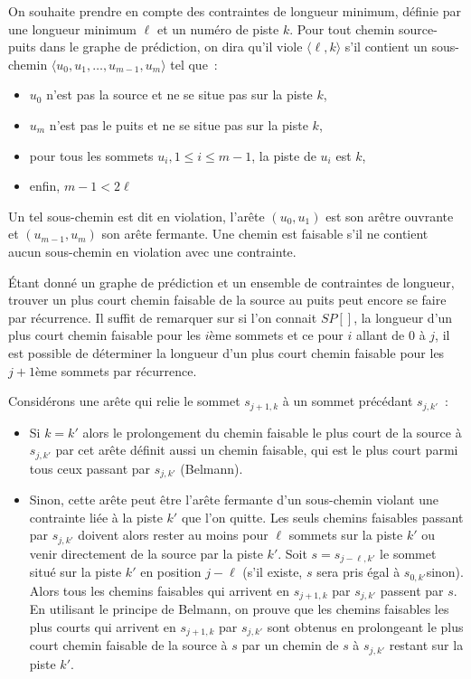 \documentclass[a4paper]{article}
\begin{document}
On souhaite prendre en compte des contraintes de longueur minimum,
d\'efinie par une longueur minimum $\ell$ et un num\'ero de piste $k$. Pour
tout chemin source-puits dans le graphe de pr\'ediction, on dira qu'il
viole $\langle\ell,k\rangle$ s'il contient un sous-chemin $\langle
u_0,u_1,\ldots,u_{m-1},u_m\rangle$ tel que~:
\begin{itemize}
\item $u_0$ n'est pas la source et ne se situe pas sur la piste $k$,
\item $u_m$ n'est pas le puits et ne se situe pas sur la piste $k$,
\item pour tous les sommets $u_i, 1\leq i\leq m-1$, la piste de $u_i$
  est $k$,
\item enfin, $m-1 < 2\ell$
\end{itemize}

Un tel sous-chemin est dit en violation, l'ar\^ete $(u_0,u_1)$ est son
ar\^etre ouvrante et $(u_{m-1},u_m)$ son ar\^ete fermante. Une chemin est
faisable s'il ne contient aucun sous-chemin en violation avec une
contrainte.

\'Etant donn\'e un graphe de pr\'ediction et un ensemble de contraintes de
longueur, trouver un plus court chemin faisable de la source au puits
peut encore se faire par r\'ecurrence. Il suffit de remarquer sur si
l'on connait $SP[]$, la longueur d'un plus court chemin faisable pour
les $i$\`eme sommets et ce pour $i$ allant de $0$ \`a $j$, il est possible
de d\'eterminer la longueur d'un plus court chemin faisable pour les
$j+1$\`eme sommets par r\'ecurrence.

Consid\'erons une ar\^ete qui relie le sommet $s_{j+1,k}$ \`a un sommet
pr\'ec\'edant $s_{j,k'}$~:
\begin{itemize}
\item Si $k=k'$ alors le prolongement du chemin faisable le plus court
  de la source \`a $s_{j,k'}$ par cet ar\^ete d\'efinit aussi un chemin
  faisable, qui est le plus court parmi tous ceux passant par
  $s_{j,k'}$ (Belmann).
\item Sinon, cette ar\^ete peut \^etre l'ar\^ete fermante d'un sous-chemin
  violant une contrainte li\'ee \`a la piste $k'$ que l'on quitte. Les
  seuls chemins faisables passant par $s_{j,k'}$ doivent alors rester
  au moins pour $\ell$ sommets sur la piste $k'$ ou venir directement de
  la source par la piste $k'$. Soit $s= s_{j-\ell,k'}$ le sommet situ\'e
  sur la piste $k'$ en position $j-\ell$ (s'il existe, $s$ sera pris
  \'egal \`a $s_{0,k'}$sinon). Alors tous les chemins faisables qui
  arrivent en $s_{j+1,k}$ par $s_{j,k'}$ passent par $s$. En utilisant
  le principe de Belmann, on prouve que les chemins faisables les plus
  courts qui arrivent en $s_{j+1,k}$ par $s_{j,k'}$ sont obtenus en
  prolongeant le plus court chemin faisable de la source \`a $s$ par un
  chemin de $s$ \`a $s_{j,k'}$ restant sur la piste $k'$.
\end{itemize}
\end{document}
